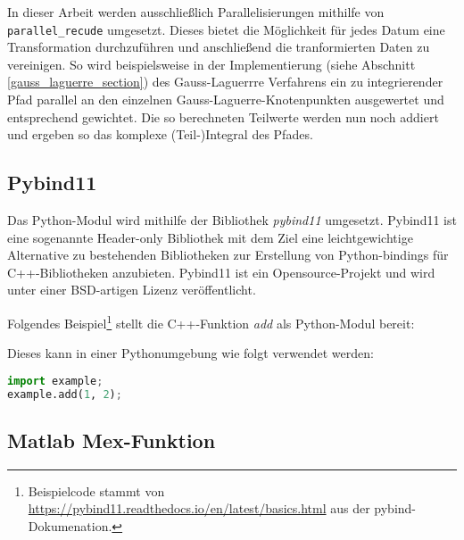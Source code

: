 \begin{center}
    
\end{center}

In dieser Arbeit werden ausschließlich Parallelisierungen mithilfe von \texttt{parallel\_recude} umgesetzt.
Dieses bietet die Möglichkeit für jedes Datum eine Transformation durchzuführen und anschließend die tranformierten Daten zu vereinigen. 
So wird beispielsweise in der Implementierung (siehe Abschnitt \ref{gauss_laguerre_section}) des Gauss-Laguerrre Verfahrens ein zu integrierender Pfad parallel an den einzelnen Gauss-Laguerre-Knotenpunkten ausgewertet und entsprechend gewichtet.
Die so berechneten Teilwerte werden nun noch addiert und ergeben so das komplexe (Teil-)Integral des Pfades. 

\subsection{Pybind11}

Das Python-Modul wird mithilfe der Bibliothek \textit{pybind11} umgesetzt.
Pybind11 ist eine sogenannte Header-only Bibliothek mit dem Ziel eine leichtgewichtige Alternative zu bestehenden Bibliotheken zur Erstellung  von
Python-bindings für C++-Bibliotheken anzubieten.
Pybind11\cite{pybind} ist ein Opensource-Projekt und wird unter einer BSD-artigen Lizenz veröffentlicht. 

Folgendes Beispiel\footnote{Beispielcode stammt von \url{https://pybind11.readthedocs.io/en/latest/basics.html} aus der pybind-Dokumenation\cite{pybind}.} stellt die C++-Funktion \textit{add} als Python-Modul bereit:
\begin{center}

\end{center}
Dieses kann in einer Pythonumgebung wie folgt verwendet werden:

\begin{center}
\begin{lstlisting}[language=Python]
import example;
example.add(1, 2);
\end{lstlisting}
\end{center}



\subsection{Matlab Mex-Funktion}

